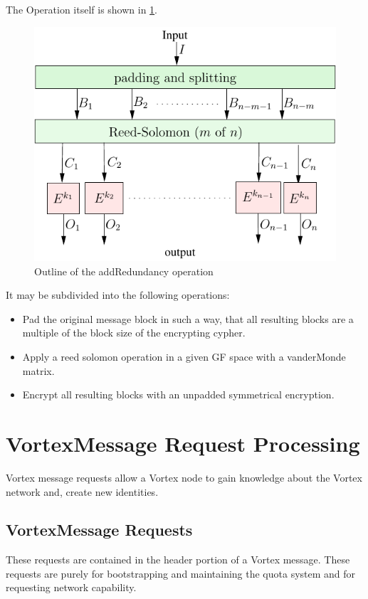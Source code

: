 The Operation itself is shown in \ref{fig:addRedundancyOperation}. 
\begin{figure}[h]
	\includegraphics[width=\textwidth]{inc/addRedundancyOp}
	\caption{Outline of the addRedundancy operation}
	\label{fig:addRedundancyOperation}
\end{figure}
It may be subdivided into the following operations:
\begin{itemize}
	\item Pad the original message block in such a way, that all resulting blocks are a multiple of the block size of the encrypting cypher.
	\item Apply a reed solomon operation in a given GF space with a vanderMonde matrix.
	\item Encrypt all resulting blocks with an unpadded symmetrical encryption.
\end{itemize}


\section{VortexMessage Request Processing}
Vortex message requests allow a Vortex node to gain knowledge about the Vortex network and, create new identities.


\subsection{VortexMessage Requests}
These requests are contained in the header portion of a Vortex message. These requests are purely for bootstrapping and maintaining the quota system and for requesting network capability.

